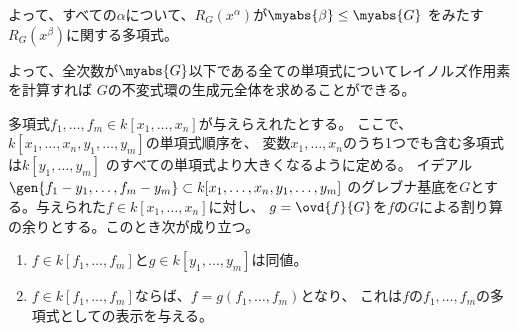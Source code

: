 \begin{myproof}
\begin{enumerate}
\begin{enumerate}
     \end{enumerate}
     よって、すべての$\alpha$について、$R_G(x^\alpha)$が$\myabs{\beta} \le \myabs{G}$
     をみたす$R_G(x^\beta)$に関する多項式。
  \end{enumerate}
\end{myproof}

よって、全次数が$\myabs{G}$以下である全ての単項式についてレイノルズ作用素を計算すれば
$G$の不変式環の生成元全体を求めることができる。

\begin{framed}
  多項式$f_1,\dots,f_m \in k[x_1,\dots,x_n]$が与えらえれたとする。
  ここで、$k[x_1,\dots,x_n,y_1,\dots,y_m]$の単項式順序を、
  変数$x_1,\dots,x_n$のうち1つでも含む多項式は$k[y_1,\dots,y_m]$
  のすべての単項式より大きくなるように定める。
  イデアル$\gen{f_1-y_1,\dots,f_m-y_m} \subset k[x_1,\dots,x_n,y_1,\dots,y_m]$
  のグレブナ基底を$G$とする。与えられた$f\in k[x_1,\dots,x_n]$に対し、
  $g=\ovd{f}{G}$を$f$の$G$による割り算の余りとする。このとき次が成り立つ。
  \begin{enumerate}[label=(\roman*)]
    \item $f\in k[f_1,\dots,f_m]$と$g\in k[y_1,\dots,y_m]$は同値。
    \item $f\in k[f_1,\dots,f_m]$ならば、$f=g(f_1,\dots,f_m)$となり、
    これは$f$の$f_1,\dots,f_m$の多項式としての表示を与える。
  \end{enumerate}
\end{framed}
